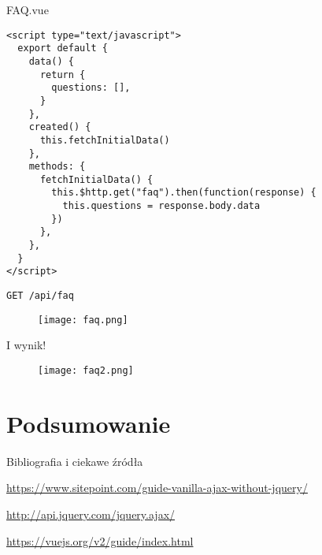 \begin{frame}[fragile]{FAQ.vue}	
	\begin{lstlisting}
<script type="text/javascript">
  export default {
    data() {
      return {
        questions: [],
      }
    },
    created() {
      this.fetchInitialData()
    },
    methods: {
      fetchInitialData() {
        this.$http.get("faq").then(function(response) {
          this.questions = response.body.data
        })
      },
    },
  }
</script>
	\end{lstlisting}
\end{frame}

\begin{frame}{\texttt{GET /api/faq}}
	\begin{figure}[t]
		\centering
		\texttt{[image: faq.png]}
	\end{figure}
\end{frame}

\begin{frame}{I wynik!}
	\begin{figure}[t]
		\centering
		\texttt{[image: faq2.png]}
	\end{figure}
\end{frame}

\section{Podsumowanie}

\begin{frame}{Bibliografia i ciekawe źródła}
  
	\begin{thebibliography}{9}
		
		\url{https://www.sitepoint.com/guide-vanilla-ajax-without-jquery/}
		
		\url{http://api.jquery.com/jquery.ajax/}
		
		\url{https://vuejs.org/v2/guide/index.html}
		
	\end{thebibliography}

\end{frame}

